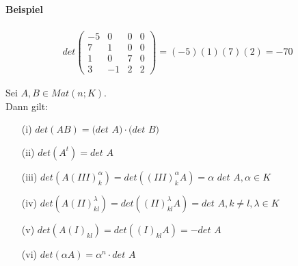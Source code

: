 \documentclass[11pt]{report}
\begin{document}
\paragraph{Beispiel}
\begin{align}
det\begin{pmatrix}
-5 & 0 & 0 & 0 \\
7 & 1 & 0 & 0 \\
1 & 0 & 7 & 0 \\
3 & -1 & 2 & 2
\end{pmatrix} = (-5)(1)(7)(2) = -70
\end{align}
\newpage
\begin{lemma}
\label{lemma614}
Sei $A, B \in Mat(n;K)$.\\
Dann gilt:
\begin{itemize}
 \item[(i)] $det(AB) = (det$ $A)\cdot (det$ $B)$
 \item[(ii)] $det(A^t) = det$ $A$
 \item[(iii)] $det(A(III)_{k}^{\alpha}) = det((III)_{k}^{\alpha}A) = \alpha$ $det$ $A, \alpha \in K$
 \item[(iv)] $det(A(II)_{kl}^{\lambda}) = det((II)_{kl}^{\lambda}A) = det$ $A, k\neq l, \lambda \in K$
 \item[(v)] $det(A(I)_{kl}) = det((I)_{kl}A) = - det$ $A$
 \item[(vi)]  $det(\alpha A) = \alpha^n \cdot det$ $A$
\end{itemize}
\end{lemma}
\end{document}
